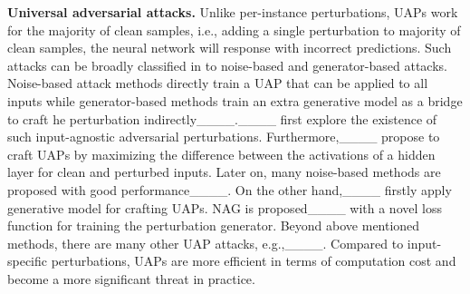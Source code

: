 \textbf{Universal adversarial attacks.} Unlike per-instance perturbations, UAPs work for the majority of clean samples, i.e., adding a single perturbation to majority of clean samples, the neural network will response with incorrect predictions. Such attacks can be broadly classified in to noise-based and generator-based attacks. Noise-based attack methods directly train a UAP that can be applied to all inputs while generator-based methods train an extra generative model as a bridge to craft he perturbation indirectly____.____ first explore the existence of such input-agnostic adversarial perturbations. 
Furthermore,____ propose to craft UAPs by maximizing the difference between the activations of a hidden layer for clean and perturbed inputs. Later on, many noise-based methods are proposed with good performance____. 
On the other hand,____ firstly apply generative model for crafting UAPs. %
NAG is proposed____ with a novel loss function for training the perturbation generator. 
Beyond above mentioned methods, there are many other UAP attacks, e.g.,____. Compared to input-specific perturbations, UAPs are more efficient in terms of computation cost and become a more significant threat in practice.

